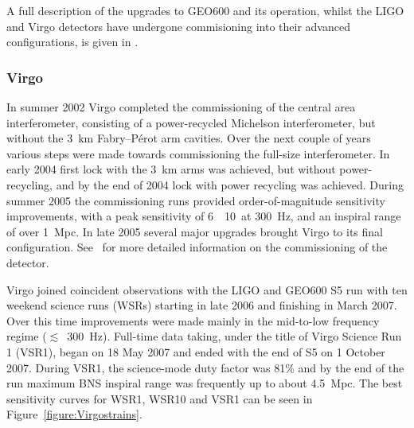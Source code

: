 A full description of the upgrades to GEO600 and its operation, whilst the LIGO and Virgo detectors have 
undergone commisioning into their advanced configurations, is given in \cite{2016CQGra..33g5009D}.

\subsubsection{Virgo}

In summer 2002 Virgo completed the commissioning of the central area interferometer, consisting of a 
power-recycled Michelson interferometer, but without the 3~km Fabry--P\'{e}rot arm cavities. Over the next 
couple of years various steps were made towards commissioning the full-size interferometer. In early 2004 
first lock with the 3~km arms was achieved, but without power-recycling, and by the end of 2004 lock with 
power recycling was achieved. During summer 2005 the commissioning runs provided order-of-magnitude
sensitivity improvements, with a peak sensitivity of 6~\texttimes~10~\Hz at 300~Hz, and an 
inspiral range of over 1~Mpc. In late 2005 several major upgrades brought Virgo to its final configuration. 
See~\cite{Acernese:2004, Acernese:2005, Acernese:2006, Acernese:2007} for more detailed information on the
commissioning of the detector.

Virgo joined coincident observations with the LIGO and GEO600 S5 run with ten weekend science runs (WSRs) 
starting in late 2006 and finishing in March 2007. Over this time improvements were made mainly in the 
mid-to-low frequency regime ($\lesssim$~300~Hz). Full-time data taking, under the title of Virgo Science Run 
1 (VSR1), began on 18 May 2007 and ended with the end of S5 on 1 October 2007. During VSR1, the science-mode 
duty factor was 81\% and by the end of the run maximum BNS inspiral range was frequently up to about 4.5~Mpc. 
The best sensitivity curves for WSR1, WSR10 and VSR1 can be seen in Figure~\ref{figure:Virgostrains}.

